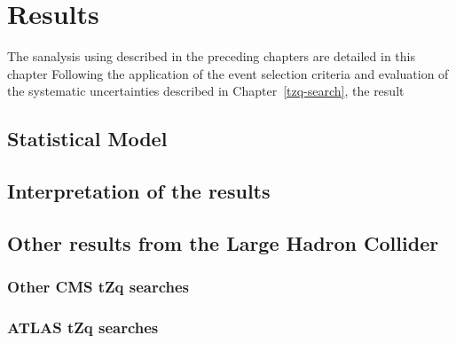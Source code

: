 \chapter{Results}\label{chapter:results}
The sanalysis using described in the preceding chapters are detailed in this chapter
Following the application of the event selection criteria and evaluation of the systematic uncertainties described in Chapter~\ref{tzq-search}, the result 

\section{Statistical Model}
\section{Interpretation of the results}
\section{Other results from the Large Hadron Collider}
\subsection{Other CMS tZq searches}
\subsection{ATLAS tZq searches}
